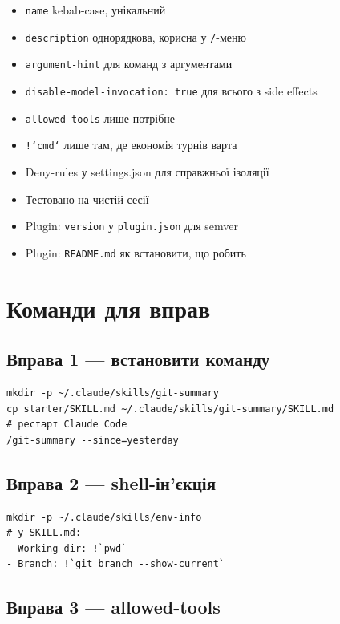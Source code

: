 \documentclass[11pt,a4paper]{article}
\begin{document}
\begin{itemize}[leftmargin=2em]
\item[$\square$] \texttt{name} kebab-case, унікальний
\item[$\square$] \texttt{description} однорядкова, корисна у \texttt{/}-меню
\item[$\square$] \texttt{argument-hint} для команд з аргументами
\item[$\square$] \texttt{disable-model-invocation: true} для всього з side effects
\item[$\square$] \texttt{allowed-tools} лише потрібне
\item[$\square$] \texttt{!`cmd`} лише там, де економія турнів варта
\item[$\square$] Deny-rules у settings.json для справжньої ізоляції
\item[$\square$] Тестовано на чистій сесії
\item[$\square$] Plugin: \texttt{version} у \texttt{plugin.json} для semver
\item[$\square$] Plugin: \texttt{README.md} як встановити, що робить
\end{itemize}

\section{Команди для вправ}

\subsection{Вправа 1 --- встановити команду}

\begin{lstlisting}
mkdir -p ~/.claude/skills/git-summary
cp starter/SKILL.md ~/.claude/skills/git-summary/SKILL.md
# рестарт Claude Code
/git-summary --since=yesterday
\end{lstlisting}

\subsection{Вправа 2 --- shell-ін'єкція}

\begin{lstlisting}
mkdir -p ~/.claude/skills/env-info
# у SKILL.md:
- Working dir: !`pwd`
- Branch: !`git branch --show-current`
\end{lstlisting}

\subsection{Вправа 3 --- allowed-tools}
\end{document}
